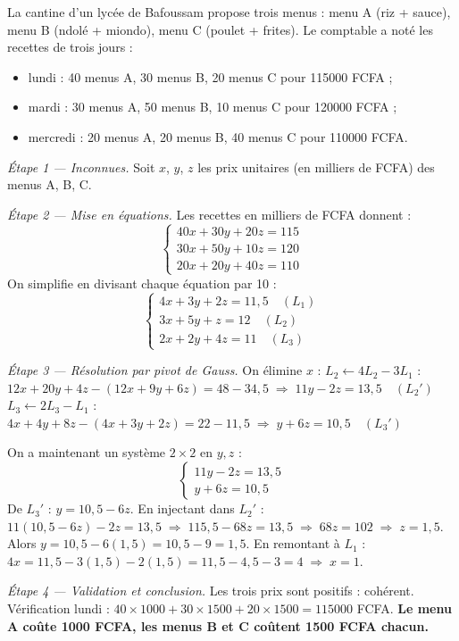 \documentclass[11pt]{article}
\begin{document}
\begin{exemplebox}
La cantine d'un lycée de Bafoussam propose trois menus : menu A (riz + sauce), menu B (ndolé + miondo), menu C (poulet + frites). Le comptable a noté les recettes de trois jours :
\begin{itemize}
\item lundi : 40 menus A, 30 menus B, 20 menus C pour \num{115000} FCFA ;
\item mardi : 30 menus A, 50 menus B, 10 menus C pour \num{120000} FCFA ;
\item mercredi : 20 menus A, 20 menus B, 40 menus C pour \num{110000} FCFA.
\end{itemize}
\emph{Étape 1 — Inconnues.} Soit $x$, $y$, $z$ les prix unitaires (en milliers de FCFA) des menus A, B, C.

\emph{Étape 2 — Mise en équations.} Les recettes en milliers de FCFA donnent :
\[
\begin{cases}
40x + 30y + 20z = 115 \\
30x + 50y + 10z = 120 \\
20x + 20y + 40z = 110
\end{cases}
\]
On simplifie en divisant chaque équation par 10 :
\[
\begin{cases}
4x + 3y + 2z = 11{,}5 \quad (L_1)\\
3x + 5y + z = 12 \quad (L_2)\\
2x + 2y + 4z = 11 \quad (L_3)
\end{cases}
\]

\emph{Étape 3 — Résolution par pivot de Gauss.} On élimine $x$ :
$L_2 \leftarrow 4L_2 - 3L_1$ : $12x + 20y + 4z - (12x + 9y + 6z) = 48 - 34{,}5 \;\Rightarrow\; 11y - 2z = 13{,}5 \quad (L_2')$
$L_3 \leftarrow 2L_3 - L_1$ : $4x + 4y + 8z - (4x + 3y + 2z) = 22 - 11{,}5 \;\Rightarrow\; y + 6z = 10{,}5 \quad (L_3')$

On a maintenant un système $2\times 2$ en $y, z$ :
\[
\begin{cases}
11y - 2z = 13{,}5 \\
y + 6z = 10{,}5
\end{cases}
\]
De $L_3'$ : $y = 10{,}5 - 6z$. En injectant dans $L_2'$ :
$11(10{,}5 - 6z) - 2z = 13{,}5 \;\Rightarrow\; 115{,}5 - 68z = 13{,}5 \;\Rightarrow\; 68z = 102 \;\Rightarrow\; z = 1{,}5$.
Alors $y = 10{,}5 - 6(1{,}5) = 10{,}5 - 9 = 1{,}5$.
En remontant à $L_1$ : $4x = 11{,}5 - 3(1{,}5) - 2(1{,}5) = 11{,}5 - 4{,}5 - 3 = 4 \;\Rightarrow\; x = 1$.

\emph{Étape 4 — Validation et conclusion.} Les trois prix sont positifs : cohérent. Vérification lundi : $40\times1000 + 30\times1500 + 20\times1500 = \num{115000}$ FCFA. \textbf{Le menu A coûte \num{1000} FCFA, les menus B et C coûtent \num{1500} FCFA chacun.}
\end{exemplebox}
\end{document}
